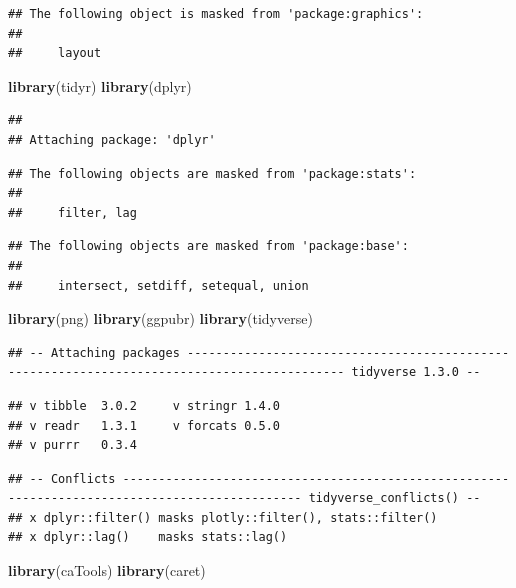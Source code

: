 \documentclass[
]{article}
\newenvironment{Shaded}{\begin{snugshade}}{\end{snugshade}}
\newcommand{\KeywordTok}[1]{\textcolor[rgb]{0.13,0.29,0.53}{\textbf{#1}}}
\newcommand{\NormalTok}[1]{#1}
\begin{document}
\begin{verbatim}
## The following object is masked from 'package:graphics':
## 
##     layout
\end{verbatim}

\begin{Shaded}
\begin{Highlighting}[]
\KeywordTok{library}\NormalTok{(tidyr)}
\KeywordTok{library}\NormalTok{(dplyr)}
\end{Highlighting}
\end{Shaded}

\begin{verbatim}
## 
## Attaching package: 'dplyr'
\end{verbatim}

\begin{verbatim}
## The following objects are masked from 'package:stats':
## 
##     filter, lag
\end{verbatim}

\begin{verbatim}
## The following objects are masked from 'package:base':
## 
##     intersect, setdiff, setequal, union
\end{verbatim}

\begin{Shaded}
\begin{Highlighting}[]
\KeywordTok{library}\NormalTok{(png)}
\KeywordTok{library}\NormalTok{(ggpubr)}
\KeywordTok{library}\NormalTok{(tidyverse)}
\end{Highlighting}
\end{Shaded}

\begin{verbatim}
## -- Attaching packages -------------------------------------------------------------------------------------------- tidyverse 1.3.0 --
\end{verbatim}

\begin{verbatim}
## v tibble  3.0.2     v stringr 1.4.0
## v readr   1.3.1     v forcats 0.5.0
## v purrr   0.3.4
\end{verbatim}

\begin{verbatim}
## -- Conflicts ----------------------------------------------------------------------------------------------- tidyverse_conflicts() --
## x dplyr::filter() masks plotly::filter(), stats::filter()
## x dplyr::lag()    masks stats::lag()
\end{verbatim}

\begin{Shaded}
\begin{Highlighting}[]
\KeywordTok{library}\NormalTok{(caTools)}
\KeywordTok{library}\NormalTok{(caret)}
\end{Highlighting}
\end{Shaded}
\end{document}
